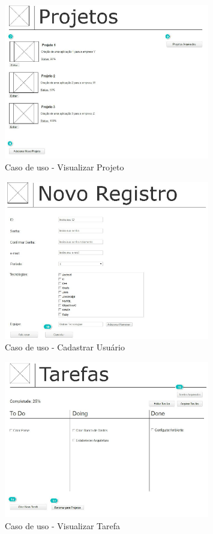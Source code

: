 \begin{figure}[H]
  \center
  \includegraphics[width=0.8\textwidth]{figuras/Prototipo3}
  \caption{Caso de uso - Visualizar Projeto}
  \label{fig:uc-visualizar-projeto}
\end{figure}

\begin{figure}[H]
  \center
  \includegraphics[width=0.8\textwidth]{figuras/Prototipo4}
  \caption{Caso de uso - Cadastrar Usuário}
  \label{fig:uc-cadastrar-usuario}
\end{figure}

\begin{figure}[H]
  \center
  \includegraphics[width=0.8\textwidth]{figuras/Prototipo5}
  \caption{Caso de uso - Visualizar Tarefa}
  \label{fig:uc-visualizar-tarefa}
\end{figure}


